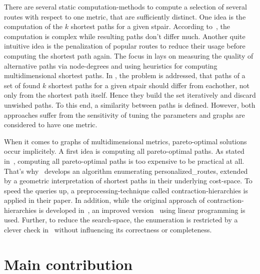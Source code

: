         There are several static computation-methods to compute a selection of several routes with respect to one \gls{metric}, that are sufficiently distinct.
        One idea is the computation of the $k$ shortest paths for a given \gls{stpair}.
        According to~\cite{eppstein:finding_k_shortest_paths}, the computation is complex while resulting paths don't differ much.
        Another quite intuitive idea is the penalization of popular routes to reduce their usage before computing the shortest path again.
        The focus in \cite{bader:alternative-route-graphs} lays on measuring the quality of alternative paths via node-degrees and using heuristics for computing multidimensional shortest paths.
        In \cite{chondrogiannis:k_shortest_paths}, the problem is addressed, that paths of a set of found $k$ shortest paths for a given \gls{stpair} should differ from eachother, not only from the shortest path itself.
        Hence they build the set iteratively and discard unwished paths.
        To this end, a similarity between paths is defined.
        However, both approaches suffer from the sensitivity of tuning the parameters and graphs are considered to have one \gls{metric}.

        When it comes to graphs of multidimensional \glspl{metric}, pareto-optimal solutions occur implicitely.
        A first idea is computing all pareto-optimal paths.
        As stated in~\cite{delling:pareto-paths}, computing all pareto-optimal paths is too expensive to be practical at all.
        That's why~\cite{barth:alternative_multicriteria_routes} develops an algorithm enumerating \glspl{personalized_route}, extended by a geometric interpretation of shortest paths in their underlying \gls{cost}-space.
        To speed the queries up, a preprocessing-technique called \gls{contraction-hierarchies} is applied in their paper.
        In addition, while the original approach of contraction-hierarchies is developed in~\cite{geisberger:contraction_hierarchies}, an improved version~\cite{funke:personal-routes} using linear programming is used.
        Further, to reduce the search-space, the enumeration is restricted by a clever check in~\cite{barth:alternative_routes} without influencing its correctness or completeness.

\section{Main contribution}

